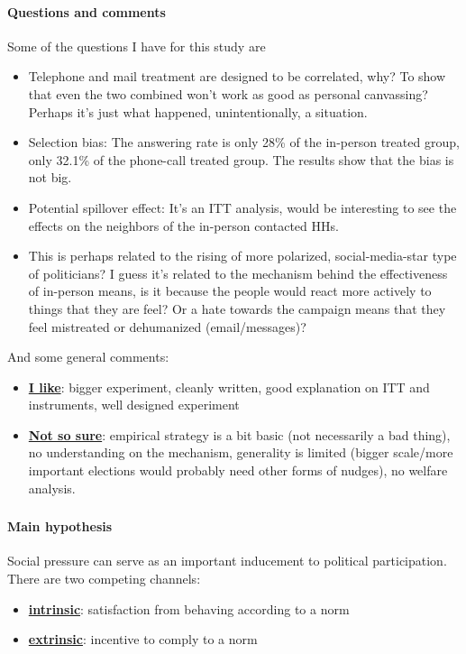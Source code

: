 \documentclass[twoside]{article}
\theoremstyle{definition}
\begin{document}
\paragraph*{Questions and comments} Some of the questions I have for this study are 
\begin{itemize}
    \item Telephone and mail treatment are designed to be correlated, why? To show that even the two combined won't work as good as personal canvassing? Perhaps it's just what happened, unintentionally, a situation.
    \item Selection bias: The answering rate is only 28\% of the in-person treated group, only 32.1\% of the phone-call treated group. The results show that the bias is not big.
    \item Potential spillover effect: It's an ITT analysis, would be interesting to see the effects on the neighbors of the in-person contacted HHs.
    \item This is perhaps related to the rising of more polarized, social-media-star type of politicians? I guess it's related to the mechanism behind the effectiveness of in-person means, is it because the people would react more actively to things that they are feel? Or a hate towards the campaign means that they feel mistreated or dehumanized (email/messages)?
\end{itemize}
And some general comments:
\begin{itemize}
    \item \textbf{\underline{I like}}: bigger experiment, cleanly written, good explanation on ITT and instruments, well designed experiment
    \item \textbf{\underline{Not so sure}}: empirical strategy is a bit basic (not necessarily a bad thing), no understanding on the mechanism, generality is limited (bigger scale/more important elections would probably need other forms of nudges), no welfare analysis.
\end{itemize}

\subsubsection*{\citet*{gerber2008social}}
\paragraph*{Main hypothesis} Social pressure can serve as an important inducement to political participation. There are two competing channels:
\begin{itemize}
    \item \textbf{\underline{intrinsic}}: satisfaction from behaving according to a norm
    \item \textbf{\underline{extrinsic}}: incentive to comply to a norm
\end{itemize}
\end{document}
